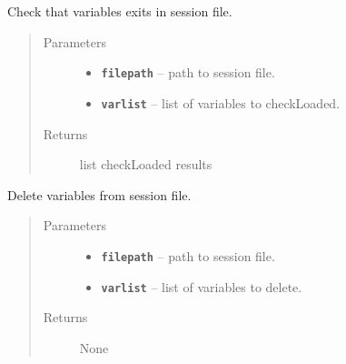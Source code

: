 \documentclass[letterpaper,10pt,english]{sphinxmanual}
\begin{document}
\begin{fulllineitems}
\label{RRtoolbox.lib:RRtoolbox.lib.session.checkFromSession}
Check that variables exits in session file.
\begin{quote}\begin{description}
\item[{Parameters}] \leavevmode\begin{itemize}
\item {} 
\textbf{\texttt{filepath}} -- path to session file.

\item {} 
\textbf{\texttt{varlist}} -- list of variables to checkLoaded.

\end{itemize}

\item[{Returns}] \leavevmode
list checkLoaded results

\end{description}\end{quote}

\end{fulllineitems}


\begin{fulllineitems}
\label{RRtoolbox.lib:RRtoolbox.lib.session.deleteFromSession}
Delete variables from session file.
\begin{quote}\begin{description}
\item[{Parameters}] \leavevmode\begin{itemize}
\item {} 
\textbf{\texttt{filepath}} -- path to session file.

\item {} 
\textbf{\texttt{varlist}} -- list of variables to delete.

\end{itemize}

\item[{Returns}] \leavevmode
None

\end{description}\end{quote}

\end{fulllineitems}
\end{document}
